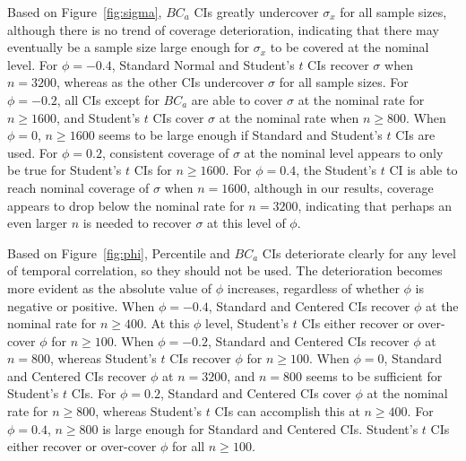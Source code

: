 \documentclass[12pt, letterpaper, titlepage]{article}
\begin{document}
Based on Figure~\ref{fig:sigma}, 
$BC_a$ CIs greatly undercover $\sigma_x$ for all sample sizes, although
there is no trend of coverage deterioration, indicating that there may eventually
be a sample size large enough for $\sigma_x$ to be covered at the nominal level.
For $\phi = -0.4$, Standard Normal and Student's $t$ CIs recover $\sigma$ when 
$n = 3200$, whereas as the other CIs undercover $\sigma$ for all sample sizes.
For $\phi  = -0.2$, all CIs except for $BC_a$ are able to cover $\sigma$ at the 
nominal rate for $n \geq 1600$, and Student's $t$ CIs cover $\sigma$ at the 
nominal rate when $n \geq 800$. When $\phi = 0$, $n \geq 1600$ seems to 
be large enough if Standard and Student's $t$ CIs are used. For $\phi = 0.2$, 
consistent coverage of $\sigma$ at the nominal level appears to only be true
for Student's $t$ CIs for $n \geq 1600$. For $\phi = 0.4$, the Student's $t$ CI is 
able to reach nominal coverage of $\sigma$ when $n = 1600$, although in 
our results, coverage appears to drop below the nominal rate for $n = 3200$, 
indicating that perhaps an even larger $n$ is needed to recover $\sigma$ at
this level of $\phi$.

Based on Figure~\ref{fig:phi}, 
Percentile and $BC_a$ CIs deteriorate clearly for any level of temporal correlation,
so they should not be used. The deterioration becomes more evident
as the absolute value of $\phi$ increases, regardless of whether $\phi$ is 
negative or positive. When $\phi = -0.4$, Standard and Centered CIs 
recover $\phi$ at the nominal rate for $n \geq 400$. At this $\phi$ level,
Student's $t$ CIs either recover or over-cover $\phi$ for $n \geq 100$. When
$\phi = -0.2$, Standard and Centered CIs recover $\phi$ at $n = 800$, whereas 
Student's $t$ CIs recover $\phi$ for $n \geq 100$. When
$\phi = 0$, Standard and Centered CIs recover $\phi$ at $n = 3200$, and 
$n = 800$ seems to be sufficient for Student's $t$ CIs. For $\phi = 0.2$, Standard
and Centered CIs cover $\phi$ at the nominal rate for $n \geq 800$, whereas 
Student's $t$ CIs can accomplish this at $n \geq 400$. For $\phi = 0.4$, $n \geq 
800$ is large enough for Standard and Centered CIs. Student's $t$ CIs either
recover or over-cover $\phi$ for all $n \geq 100$.
\end{document}
